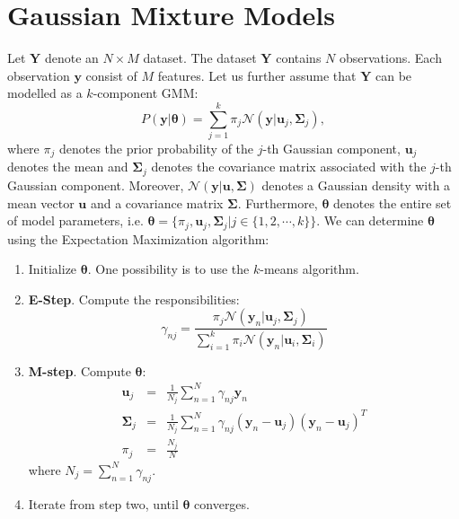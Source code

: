 \documentclass{article}
\begin{document}
\section{Gaussian Mixture Models}
\label{sec:GMM}
Let $\mathbf{Y}$ denote an $N\times M$ dataset. The dataset $\mathbf{Y}$ contains $N$ observations. Each observation $\mathbf{y}$ consist of $M$ features. Let us further assume 
that $\mathbf{Y}$ can be modelled as a $k$-component GMM:
\begin{equation}
P(\mathbf{y}|\boldsymbol{\theta})=\sum_{j=1}^k \pi_j \mathcal{N}(\mathbf{y}|\mathbf{u}_j,\mathbf{\Sigma}_j),
\end{equation}
where $\pi_j$ denotes the prior probability of the $j$-th Gaussian component, $\mathbf{u}_j$ denotes the mean and $\mathbf{\Sigma}_j$ denotes the covariance matrix associated with the $j$-th Gaussian component. Moreover,
$\mathcal{N}(\mathbf{y}|\mathbf{u},\mathbf{\Sigma})$ denotes a Gaussian density with a mean vector $\mathbf{u}$ and a covariance matrix $\mathbf{\Sigma}$. Furthermore, $\boldsymbol{\theta}$ denotes the entire set of model parameters, i.e. $\boldsymbol{\theta}=\{\pi_j,\mathbf{u}_j,\mathbf{\Sigma}_j|j\in\{1,2,\cdots,k\}\}$.
We can determine $\boldsymbol{\theta}$ using the Expectation Maximization algorithm:
\begin{enumerate}
 \item Initialize $\boldsymbol{\theta}$. One possibility is to use the $k$-means algorithm.
 \item \textbf{E-Step}. Compute the responsibilities:
 \begin{equation}
  \gamma_{nj} = \frac{\pi_j\mathcal{N}(\mathbf{y}_n|\mathbf{u}_j,\mathbf{\Sigma}_j)}{\sum_{i=1}^{k}\pi_i\mathcal{N}(\mathbf{y}_n|\mathbf{u}_i,\mathbf{\Sigma}_i)}
 \end{equation}
 \item \textbf{M-step}. Compute $\boldsymbol{\theta}$:
 \begin{eqnarray}
  \mathbf{u}_j &=& \frac{1}{N_j} \sum_{n=1}^{N} \gamma_{nj}\mathbf{y}_n\\
  \mathbf{\Sigma}_j &=& \frac{1}{N_j} \sum_{n=1}^{N} \gamma_{nj} (\mathbf{y}_n-\mathbf{u}_j)(\mathbf{y}_n-\mathbf{u}_j)^T\\
  \pi_j &=& \frac{N_j}{N}
 \end{eqnarray}
 where $N_j = \sum_{n=1}^N \gamma_{nj}$.
 \item Iterate from step two, until $\boldsymbol{\theta}$ converges.
\end{enumerate}
\end{document}
